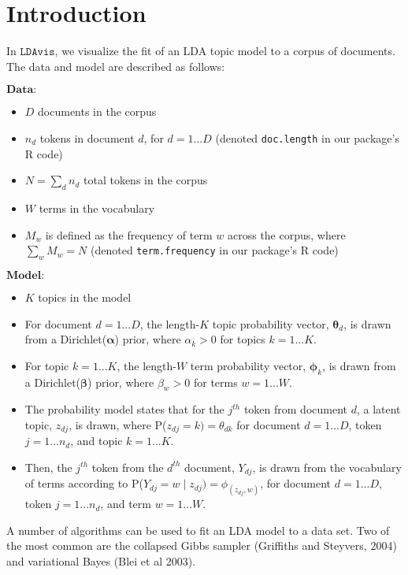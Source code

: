 \documentclass[12pt]{article}
\begin{document}


\section{Introduction}
In $\texttt{LDAvis}$, we visualize the fit of an LDA topic model to a corpus of documents. The data and model are described as follows:

$\textbf{Data:}$
\begin{itemize}
\item $D$ documents in the corpus
\item $n_d$ tokens in document $d$, for $d = 1...D$ (denoted \texttt{doc.length} in our package's R code)
\item $N = \sum_d n_d$ total tokens in the corpus
\item $W$ terms in the vocabulary
\item $M_w$ is defined as the frequency of term $w$ across the corpus, where $\sum_w M_w = N$  (denoted \texttt{term.frequency} in our package's R code)
\end{itemize}

$\textbf{Model:}$
\begin{itemize}
\item $K$ topics in the model
\item For document $d = 1...D$, the length-$K$ topic probability vector, $\boldsymbol{\theta}_d$, is drawn from a Dirichlet($\boldsymbol{\alpha}$) prior, where $\alpha_k > 0$ for topics $k = 1...K$.
\item For topic $k = 1...K$, the length-$W$ term probability vector, $\boldsymbol{\phi}_k$, is drawn from a Dirichlet($\boldsymbol{\beta}$) prior, where $\beta_w > 0$ for terms $w = 1...W$.
\item The probability model states that for the $j^{th}$ token from document $d$, a latent topic, $z_{dj}$, is drawn, where P($z_{dj} = k) = \theta_{dk}$ for document $d = 1...D$, token $j = 1...n_d$, and topic $k = 1...K$.
\item Then, the $j^{th}$ token from the $d^{th}$ document, $Y_{dj}$, is drawn from the vocabulary of terms according to P($Y_{dj} = w \mid z_{dj}) = \phi_{(z_{dj},w)}$, for document $d = 1...D$, token $j = 1...n_d$, and term $w = 1...W$.
\end{itemize}
A number of algorithms can be used to fit an LDA model to a data set. Two of the most common are the collapsed Gibbs sampler (Griffiths and Steyvers, 2004) and variational Bayes (Blei et al 2003).
\end{document}
